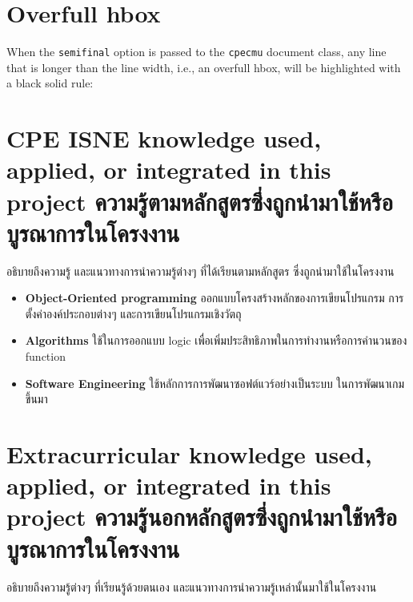 


\section{Overfull hbox}

When the \verb.semifinal. option is passed to the \verb.cpecmu. document class,
any line that is longer than the line width, i.e., an overfull hbox, will be
highlighted with a black solid rule:

\section{\ifenglish%
\ifcpe CPE \else ISNE \fi knowledge used, applied, or integrated in this project
\else%
ความรู้ตามหลักสูตรซึ่งถูกนำมาใช้หรือบูรณาการในโครงงาน
\fi
}

อธิบายถึงความรู้ และแนวทางการนำความรู้ต่างๆ ที่ได้เรียนตามหลักสูตร ซึ่งถูกนำมาใช้ในโครงงาน
\begin{itemize}
  \item \textbf{Object-Oriented programming} ออกแบบโครงสร้างหลักของการเขียนโปรแกรม การตั้งค่าองค์ประกอบต่างๆ และการเขียนโปรแกรมเชิงวัตถุ
  \item \textbf{Algorithms} ใช้ในการออกแบบ logic เพื่อเพิ่มประสิทธิภาพในการทำงานหรือการคำนวนของ function
  \item \textbf{Software Engineering} ใช้หลักการการพัฒนาซอฟต์แวร์อย่างเป็นระบบ ในการพัฒนาเกมขึ้นมา
\end{itemize}

\section{\ifenglish%
Extracurricular knowledge used, applied, or integrated in this project
\else%
ความรู้นอกหลักสูตรซึ่งถูกนำมาใช้หรือบูรณาการในโครงงาน
\fi
}

อธิบายถึงความรู้ต่างๆ ที่เรียนรู้ด้วยตนเอง และแนวทางการนำความรู้เหล่านั้นมาใช้ในโครงงาน
